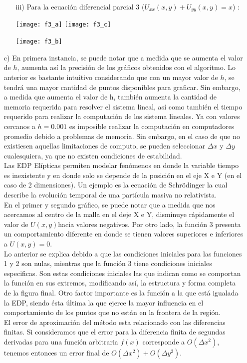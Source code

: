 \documentclass[letterpaper]{article}
\newcommand{\5}
{
\\[.5cm]
}
\begin{document}
\begin{itemize}
\begin{itemize}
        \item[iii)] Para la ecuación diferencial parcial 3 ($U_{xx}(x,y)+U_{yy}(x,y) = x$) :
        \begin{center}
        	\centerline{%
            	\texttt{[image: f3\_a]}%
            	\texttt{[image: f3\_c]}%
            }%
            \centerline{%
            	\texttt{[image: f3\_b]}%
                \hspace{0.5\linewidth}
            }%
        \end{center}
	\end{itemize}
 \item[c)] En primera instancia, se puede notar que a medida que se aumenta el valor de $h$, aumenta así la precisión de los gráficos obtenidos con el algoritmo. Lo anterior es bastante intuitivo considerando que con un mayor valor de $h$, se tendrá una mayor cantidad de puntos disponibles para graficar. Sin embargo, a medida que aumenta el valor de h, también aumenta la cantidad de memoria requerida para resolver el sistema lineal, así como también el tiempo requerido para realizar la computación de los sistema lineales. Ya con valores cercanos a $h = 0.001$ es imposible realizar la computación en computadores promedio debido a problemas de memoria. Sin embargo, en el caso de que no existiesen aquellas limitaciones de computo, se pueden seleccionar $\Delta x$ y $\Delta y$ cualesquiera, ya que no existen condiciones de estabilidad. \\[0.2cm]
 Las EDP Elípticas permiten modelar fenómenos en donde la variable tiempo es inexistente y en donde solo se depende de la posición en el eje X e Y (en el caso de 2 dimensiones). Un ejemplo es la ecuación de Schrödinger la cual describe la evolución temporal de una partícula masiva no relativista. \\[0.2cm]
 En el primer y segundo gráfico, se puede notar que a medida que nos acercamos al centro de la malla en el deje X e Y, disminuye rápidamente el valor de $U(x, y)$hacia valores negativos. Por otro lado, la función 3 presenta un comportamiento diferente en donde se tienen valores superiores e inferiores a $U(x, y) = 0$. \\[0.2cm]
 Lo anterior se explica debido a que las condiciones iniciales para las funciones 1 y 2 son nulas, mientras que la función 3 tiene condiciones iniciales especificas. Son estas condiciones iniciales las que indican como se comportan la función en sus extremos, modificando así, la estructura y forma completa de la figura final. Otro factor importante es la función a la que está igualada la EDP, siendo ésta última la que ejerce la mayor influencia en el comportamiento de los puntos que no están en la frontera de la región. \\[0.2cm]
 El error de aproximación del método esta relacionado con las diferencias finitas. Si consideramos que el error para la diferencia finita de segundas derivadas para una función arbitraria $f(x)$ corresponde a $O(\Delta x^2)$, tenemos entonces un error final de $O(\Delta x^2) + O(\Delta y^2)$.
\end{itemize}
\end{document}
